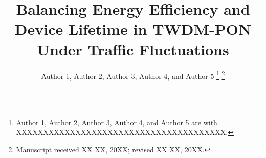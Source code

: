 \documentclass[letter]{IEEEtran}
\begin{document}
%
\title{\Large{Balancing Energy Efficiency and Device Lifetime in TWDM-PON \\Under Traffic Fluctuations}}
%
%
%

\author{Author 1, Author 2, Author 3, Author 4, and Author 5%
\thanks{Author 1, Author 2, Author 3, Author 4, and Author 5 are with XXXXXXXXXXXXXXXXXXXXXXXXXXXXXXXXXXXXXXX.}%
\thanks{Manuscript received XX XX, 20XX; revised XX XX, 20XX.}}

% 
%
\end{document}
